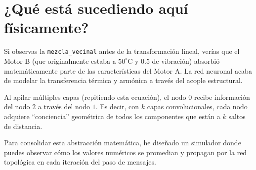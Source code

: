 \documentclass[12pt,a4paper]{article}
\begin{document}
\section{¿Qué está sucediendo aquí físicamente?}

Si observas la \texttt{mezcla\_vecinal} antes de la transformación lineal, verías que el Motor B (que originalmente estaba a $50^\circ$C y $0.5$ de vibración) absorbió matemáticamente parte de las características del Motor A. La red neuronal acaba de modelar la transferencia térmica y armónica a través del acople estructural.

Al apilar múltiples capas (repitiendo esta ecuación), el nodo $0$ recibe información del nodo $2$ a través del nodo $1$. Es decir, con $k$ capas convolucionales, cada nodo adquiere ``conciencia'' geométrica de todos los componentes que están a $k$ saltos de distancia.

Para consolidar esta abstracción matemática, he diseñado un simulador donde puedes observar cómo los valores numéricos se promedian y propagan por la red topológica en cada iteración del paso de mensajes.
\end{document}
